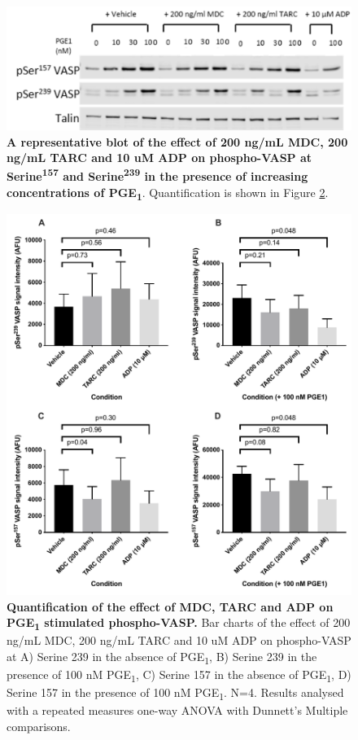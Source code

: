 \documentclass[11pt,twoside]{bristolthesis}
\begin{document}
\begin{figure}
\includegraphics[width=0.6\linewidth]{figure/Chemokines/MDC_TARC_VASP_blot} \caption[A representative blot of the effect of MDC, TARC and ADP on PGE\textsubscript{1} stimulated phospho-VASP.]{\textbf{A representative blot of the effect of 200 ng/mL MDC, 200 ng/mL TARC and 10 uM ADP on phospho-VASP at Serine\textsuperscript{157} and Serine\textsuperscript{239} in the presence of increasing concentrations of PGE\textsubscript{1}}. Quantification is shown in Figure \ref{fig:MDC-TARC-wp-VASP-bar}.}\label{fig:MDC-TARC-wp-WB-VASP}
\end{figure}


\begin{figure}
\includegraphics{figure/Chemokines/Layouts/MDC_TARC_WB_VASP} \caption[Quantification of the effect of MDC, TARC and ADP on PGE\textsubscript{1} stimulated phospho-VASP.]{\textbf{Quantification of the effect of MDC, TARC and ADP on PGE\textsubscript{1} stimulated phospho-VASP.} Bar charts of the effect of 200 ng/mL MDC, 200 ng/mL TARC and 10 uM ADP on phospho-VASP at A) Serine 239 in the absence of PGE\textsubscript{1}, B) Serine 239 in the presence of 100 nM PGE\textsubscript{1}, C) Serine 157 in the absence of PGE\textsubscript{1}, D) Serine 157 in the presence of 100 nM PGE\textsubscript{1}. N=4. Results analysed with a repeated measures one-way ANOVA with Dunnett's Multiple comparisons.}\label{fig:MDC-TARC-wp-VASP-bar}
\end{figure}
\end{document}
